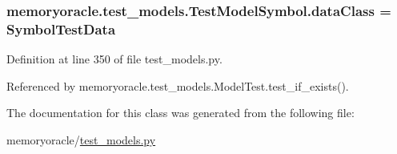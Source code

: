 \subsubsection[{data\+Class}]{\setlength{\rightskip}{0pt plus 5cm}memoryoracle.\+test\+\_\+models.\+Test\+Model\+Symbol.\+data\+Class = {\bf Symbol\+Test\+Data}\hspace{0.3cm}{\ttfamily [static]}}\label{classmemoryoracle_1_1test__models_1_1TestModelSymbol_a2ea3357ca2735d0ff93f4b6f10b7edaa}


Definition at line 350 of file test\+\_\+models.\+py.



Referenced by memoryoracle.\+test\+\_\+models.\+Model\+Test.\+test\+\_\+if\+\_\+exists().



The documentation for this class was generated from the following file\+:\begin{DoxyCompactItemize}
\item 
memoryoracle/\hyperlink{test__models_8py}{test\+\_\+models.\+py}\end{DoxyCompactItemize}
